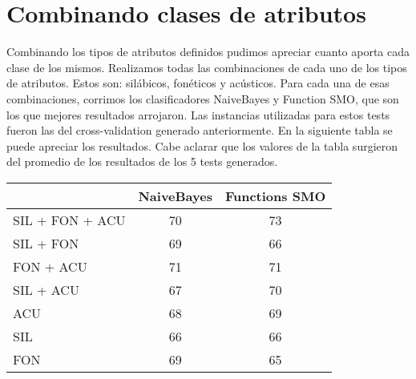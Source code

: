 %

\section{Combinando clases de atributos}

Combinando los tipos de atributos definidos pudimos apreciar cuanto aporta cada clase de los mismos. Realizamos todas las combinaciones de cada uno de los tipos de atributos. Estos son: silábicos, fonéticos y acústicos. Para cada una de esas combinaciones, corrimos los clasificadores NaiveBayes y Function SMO, que son los que mejores resultados arrojaron. Las instancias utilizadas para estos tests fueron las del cross-validation generado anteriormente. En la siguiente tabla se puede apreciar los resultados. Cabe aclarar que los valores de la tabla surgieron del promedio de los resultados de los 5 tests generados.  



\begin{table}[H]
\centering
\begin{tabular}{|l|c|c|}
\hline
\textbf{} & \textbf{NaiveBayes} & \textbf{Functions SMO}   \\ \hline
SIL + FON + ACU & 70 & 73 \\ \hline
SIL + FON & 69 & 66 \\ \hline
FON + ACU & 71 & 71 \\ \hline
SIL + ACU & 67 & 70 \\ \hline
ACU & 68 & 69 \\ \hline
SIL & 66 & 66 \\ \hline
FON & 69 & 65 \\ \hline
\end{tabular}
\end{table}


